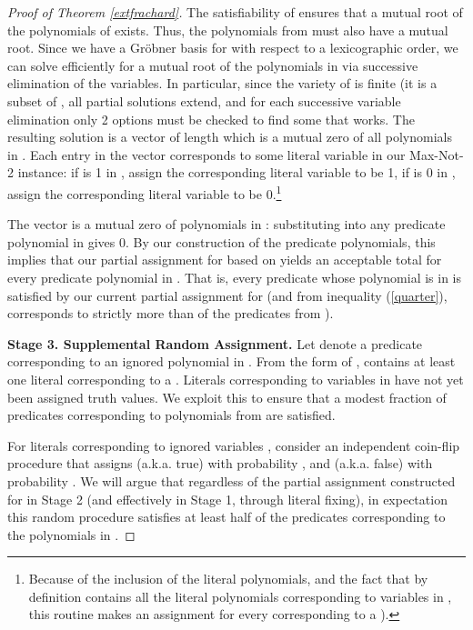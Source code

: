 \documentclass{article}
\begin{document}
\begin{proof}[Proof of Theorem \ref{extfrachard}]
The satisfiability of  ensures that a mutual root of the polynomials of  exists. Thus,  the polynomials from  must also have a mutual root.
Since we have a Gr\"{o}bner basis for  with respect to a lexicographic order, we can solve efficiently for a mutual root of the polynomials in  via successive elimination of the variables. In particular, since the variety of  is finite (it is a subset of , all partial solutions extend, and for each successive variable elimination only 2 options must be checked to find some  that works. The resulting solution is a vector  of length  which is a mutual zero of all polynomials in . Each entry in the vector corresponds to some literal variable in our Max-Not-2 instance: if  is 1 in , assign the corresponding literal variable  to be 1, if  is 0 in , assign the corresponding literal variable  to be 0.\footnote{Because of the inclusion of the literal polynomials, and the fact that by definition  contains all the literal polynomials corresponding to variables in , this routine makes an assignment for every  corresponding to a  ).} 

The vector  is a mutual zero of polynomials in : substituting  into any predicate polynomial in  gives 0. By our construction of the predicate polynomials, this implies that our partial assignment for  based on  yields an acceptable total for every predicate polynomial in . That is, every predicate whose polynomial is in  is satisfied by our current partial assignment for  (and from inequality (\ref{quarter}),  corresponds to strictly more than  of the predicates from ).

\vspace{2mm}

\noindent \textbf{Stage 3. Supplemental Random Assignment.} Let  denote a
predicate corresponding to an ignored polynomial in . From the form of ,  contains at least one literal corresponding to a .   
Literals corresponding to variables in  have not yet been assigned truth values.
We exploit this to ensure that a modest fraction of predicates corresponding to polynomials from  are satisfied. 

For literals corresponding to ignored variables , consider an independent coin-flip procedure that assigns  (a.k.a.  true) with probability , and  (a.k.a.  false) with probability . 
We will argue that regardless of the partial assignment constructed for  in Stage 2 (and effectively in Stage 1, through literal fixing), in expectation this random procedure satisfies at least half of the predicates corresponding to the polynomials in . 



\end{proof}
\end{document}
